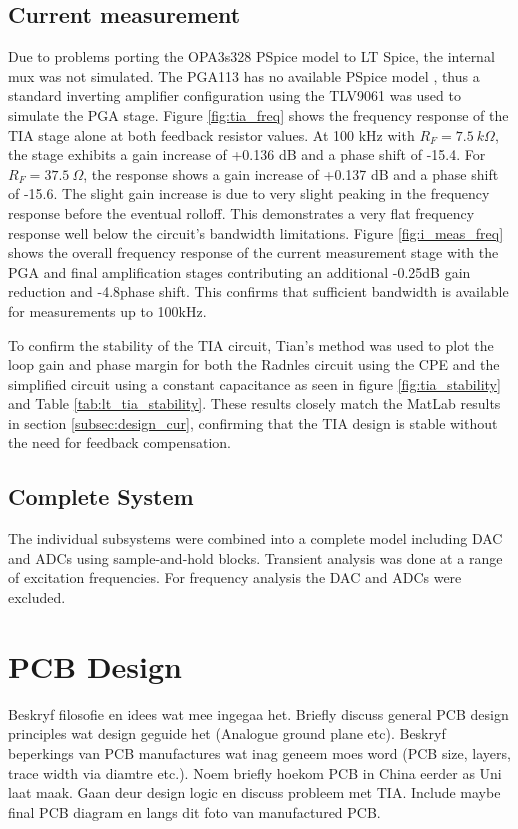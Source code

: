 \subsection{Current measurement}
Due to problems porting the OPA3s328 PSpice model to LT Spice, the internal mux was not simulated. The PGA113 has no available PSpice model \cite{PGA113PspiceModel2022}, thus a standard inverting amplifier configuration using the TLV9061 was used to simulate the PGA stage. Figure \ref{fig:tia_freq} shows the frequency response of the TIA stage alone at both feedback resistor values. At 100 kHz with $R_F = 7.5~k\Omega$, the stage exhibits a gain increase of +0.136 dB and a phase shift of -15.4\textdegree. For $R_F = 37.5~\Omega$, the response shows a gain increase of +0.137 dB and a phase shift of -15.6\textdegree. The slight gain increase is due to very slight peaking in the frequency response before the eventual rolloff. This demonstrates a very flat frequency response well below the circuit's bandwidth limitations. Figure \ref{fig:i_meas_freq} shows the overall frequency response of the current measurement stage with the PGA and final amplification stages contributing an additional -0.25dB gain reduction and -4.8\textdegree phase shift. This confirms that sufficient bandwidth is available for measurements up to 100kHz.

To confirm the stability of the TIA circuit, Tian's method was used to plot the loop gain and phase margin for both the Radnles circuit using the \ac{CPE} and the simplified circuit using a constant capacitance as seen in figure \ref{fig:tia_stability} and Table \ref{tab:lt_tia_stability}. These results closely match the MatLab results in section \ref{subsec:design_cur}, confirming that the TIA design is stable without the need for feedback compensation.

\subsection{Complete System}
The individual subsystems were combined into a complete model including DAC and ADCs using sample-and-hold blocks. Transient analysis was done at a range of excitation frequencies. For frequency analysis the DAC and ADCs were excluded.

\section{PCB Design}\label{sec:PCB}
Beskryf filosofie en idees wat mee ingegaa het. Briefly discuss general PCB design principles wat design geguide het (Analogue ground plane etc). Beskryf beperkings van PCB manufactures wat inag geneem moes word (PCB size, layers, trace width via diamtre etc.). Noem briefly hoekom PCB in China eerder as Uni laat maak. Gaan deur design logic en discuss probleem met TIA. Include maybe final PCB diagram en langs dit foto van manufactured PCB.

